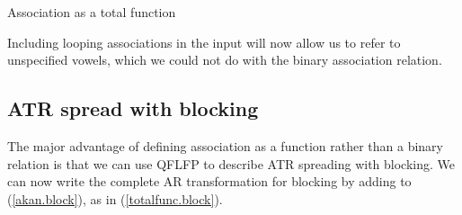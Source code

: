 \documentclass[,doc,floatsintext]{apa6}
\theoremstyle{definition}
\theoremstyle{definition}
\theoremstyle{definition}
\theoremstyle{remark}
\begin{document}
\begin{exe}
\ex \label{total.func} Association as a total function \\
\end{exe}

\noindent Including looping associations in the input will now allow us
to refer to unspecified vowels, which we could not do with the binary
association relation.

\newpage

\subsection{ATR spread with blocking}\label{atr-spread-with-blocking}

The major advantage of defining association as a function rather than a
binary relation is that we can use QFLFP to describe ATR spreading with
blocking. We can now write the complete AR transformation for blocking
by adding to (\ref{akan.block}), as in (\ref{totalfunc.block}).
\end{document}
